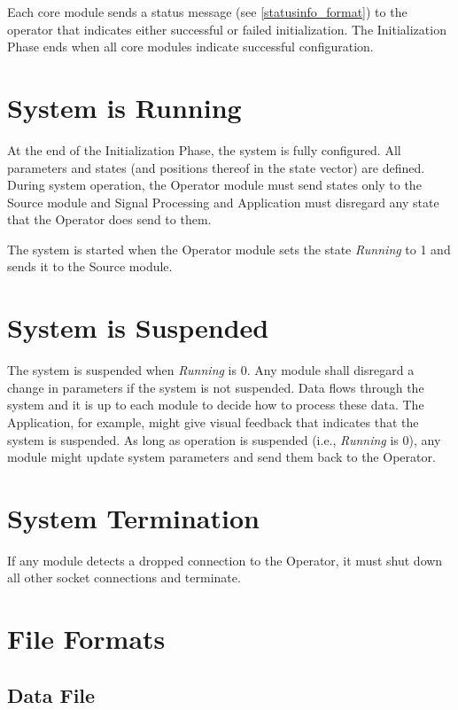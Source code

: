\documentclass[letterpaper,oneside,12pt]{book}
\begin{document}
Each core module sends a status message (see \ref{statusinfo_format}) to the 
operator that indicates either successful or failed initialization. The 
Initialization Phase ends when all core modules indicate successful 
configuration.


\section{System is Running}
\label{system_performance}

At the end of the Initialization Phase, the system is fully configured. All 
parameters and states (and positions thereof in the state vector) are defined. 
During system operation, the Operator module must send states only to the Source 
module and Signal Processing and Application must disregard any state that the 
Operator does send to them. 

The system is started when the Operator module sets the state \textit{Running} 
to 1 and sends it to the Source module. 


\section{System is Suspended}
\label{sec:system_suspended}

The system is suspended when \textit{Running} is 0. Any module shall disregard a 
change in parameters if the system is not suspended. Data flows through the 
system and it is up to each module to decide how to process these data. The 
Application, for example, might give visual feedback that indicates that the 
system is suspended. As long as operation is suspended (i.e., \textit{Running} 
is 0), any module might update system parameters and send them back to the 
Operator.


\section{System Termination}
\label{system_termination}

If any module detects a dropped connection to the Operator, it must shut down 
all other socket connections and terminate.

\section{File Formats}

\subsection{Data File}
\end{document}

